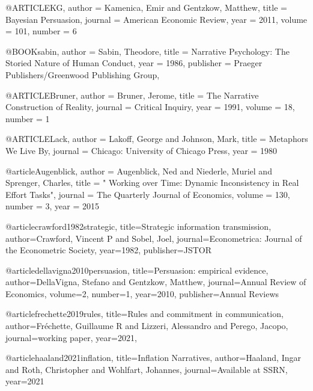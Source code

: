 @ARTICLE{KG,
author =       {Kamenica, Emir  and Gentzkow, Matthew},
title =        {Bayesian Persuasion},
journal =      {American Economic Review},
year =         {2011},
volume =       {101},
number =       {6}
}


@BOOK{sabin,
author =       {Sabin, Theodore},
title =        {Narrative Psychology: The Storied Nature of Human Conduct},
year =         {1986},
publisher =    {Praeger Publishers/Greenwood Publishing Group},
}


@ARTICLE{Bruner,
author =       {Bruner, Jerome},
title =        {The Narrative Construction of Reality},
journal =      {Critical Inquiry},
year =         {1991},
volume =       {18},
number =       {1}
}

@ARTICLE{Lack,
author =       {Lakoff, George and Johnson, Mark},
title =        {Metaphors We Live By},
journal =      {Chicago: University of Chicago
Press},
year =         {1980}
}

@article{Augenblick,
  author = {Augenblick, Ned and Niederle, Muriel and Sprenger, Charles},
  title = "{ Working over Time: Dynamic Inconsistency in Real Effort Tasks}",
  journal = {The Quarterly Journal of Economics},
  volume = {130},
  number = {3},
  year = {2015}
}

@article{crawford1982strategic,
title={Strategic information transmission},
author={Crawford, Vincent P and Sobel, Joel},
journal={Econometrica: Journal of the Econometric Society},
year={1982},
publisher={JSTOR}
}


@article{dellavigna2010persuasion,
title={Persuasion: empirical evidence},
author={DellaVigna, Stefano and Gentzkow, Matthew},
journal={Annual Review of Economics},
volume={2},
number={1},
year={2010},
publisher={Annual Reviews}
}

@article{frechette2019rules,
title={Rules and commitment in communication},
author={Fr{\'e}chette, Guillaume R and Lizzeri, Alessandro and Perego, Jacopo},
journal={working paper},
year={2021},
}

@article{haaland2021inflation,
title={Inflation Narratives},
author={Haaland, Ingar and Roth, Christopher and Wohlfart, Johannes},
journal={Available at SSRN},
year={2021}
}



